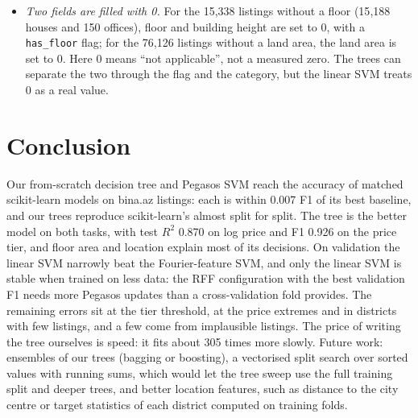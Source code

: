 \documentclass[10pt,twocolumn,a4paper]{article}
\begin{document}
\begin{itemize}
  the Task~A depth stops at the grid's largest value, 12, %
  so a deeper tree might do better.
  \item \textit{Two fields are filled with 0.} For the 15{,}338 listings %
  without a floor (15{,}188 houses and 150 offices), %
  floor and building height are set to 0, with a \texttt{has\_floor}
  flag; for the 76{,}126 listings without a land area, %
  the land area is set to 0. Here 0 means ``not applicable'', not a
  measured zero. The trees can separate the two through the flag and the
  category, but the linear SVM treats 0 as a real value.
\end{itemize}

\section{Conclusion}
Our from-scratch decision tree and Pegasos SVM reach the accuracy of
matched scikit-learn models on bina.az listings: each is within 0.007 F1 %
of its best baseline, and our trees reproduce scikit-learn's almost split
for split. The tree is the better model on both tasks, with test $R^2$ 0.870 %
on log price and F1 0.926 on the price tier, %
and floor area and location explain most of its decisions. On validation
the linear SVM narrowly beat the Fourier-feature SVM, and only the linear
SVM is stable when trained on less data: the RFF configuration with the
best validation F1 needs more Pegasos updates than a cross-validation
fold provides. The remaining errors sit at
the tier threshold, at the price extremes and in districts with few
listings, and a few come from implausible listings. The price of writing
the tree ourselves is speed: it fits about 305 times more slowly. %
Future work: ensembles of our trees (bagging or boosting), a vectorised
split search over sorted values with running sums, which would let the
tree sweep use the full training split and deeper trees, and better location features, such as
distance to the city centre or target statistics of each district
computed on training folds.
\end{document}
